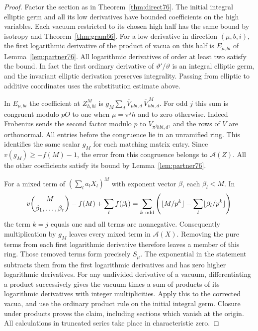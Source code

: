 \documentclass[a4paper,11pt]{article}
\theoremstyle{definition}
\theoremstyle{remark}
\numberwithin{equation}{section}
\begin{document}
\begin{proof}
Factor the section as in Theorem~\ref{thm:direct76}. The initial
integral elliptic germ and all its low derivatives have bounded
coefficients on the high variables. Each vacuum restricted to
its chosen high half has the same bound by isotropy and
Theorem~\ref{thm:gram66}. For a low derivative in direction
\((\mu,b,i)\), the first logarithmic derivative of the product of
vacua on this half is \(E_{\mu,bi}\) of
Lemma~\ref{lem:partner76}. All logarithmic derivatives of order
at least two satisfy the bound. In fact the first ordinary
derivative of \(\vartheta'/\vartheta\) is an integral elliptic
germ, and the invariant elliptic derivation preserves integrality.
Passing from elliptic to additive coordinates uses the substitution
estimate above.

In \(E_{\mu,bi}\) the coefficient at \(Z_{h,bi}^{M}\) is
\(g_M\sum_d \overline V_{\mu bi,d}\,\overline V_{hbi,d}^{\,M}\).
For odd \(j\) this sum is congruent modulo \(pO\) to one when
\(\mu=\pi^jh\) and to zero otherwise. Indeed Frobenius sends
the second factor modulo \(p\) to \(V_{\pi^j hbi,d}\), and the
rows of \(V\) are orthonormal. All entries before the congruence
lie in an unramified ring. This identifies the same scalar
\(g_M\) for each matching matrix entry. Since
\(v(g_M)\ge-f(M)-1\), the error from this congruence belongs to
\(\mathcal A(Z)\). All the other coefficients satisfy its bound
by Lemma~\ref{lem:partner76}.

For a mixed term of \((\sum_l a_l X_l)^M\) with exponent vector
\(\beta\), each \(\beta_l<M\). In
\[
 v\binom{M}{\beta_1,\ldots,\beta_r}
       - f(M)+\sum_l f(\beta_l)
   =\sum_{k\ {\rm odd}}
       \left(\lfloor M/p^k\rfloor-\sum_l\lfloor\beta_l/p^k\rfloor\right)
\]
the term \(k=j\) equals one and all terms are nonnegative.
Consequently multiplication by \(g_M\) leaves every mixed term
in \(\mathcal A(X)\). Removing the pure terms from each first
logarithmic derivative therefore leaves a member of this ring.
Those removed terms form precisely \(S_\mu\). The exponential
in the statement subtracts them from the first logarithmic
derivatives and has zero higher logarithmic derivatives. For
any undivided derivative of a vacuum, differentiating a product
successively gives the vacuum times a sum of products of its
logarithmic derivatives with integer multiplicities. Apply this
to the corrected vacua, and use the ordinary product rule on the
initial integral germ. Closure under products proves the claim,
including sections which vanish at the origin. All calculations
in truncated series take place in characteristic zero.
\end{proof}
\end{document}
